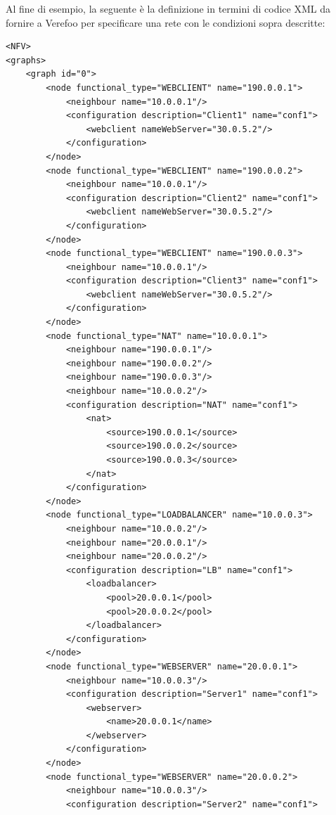 Al fine di esempio, la seguente è la definizione in termini di codice XML da fornire a Verefoo per specificare una rete con le condizioni sopra descritte: 

\begin{lstlisting}[style=mystyle,caption={Definizione nodi del ServiceGraph \ref*{fig:Service_Graph}}, label= lst:service_graphh]
<NFV>
<graphs>
    <graph id="0">
        <node functional_type="WEBCLIENT" name="190.0.0.1">
            <neighbour name="10.0.0.1"/>
            <configuration description="Client1" name="conf1">
                <webclient nameWebServer="30.0.5.2"/>
            </configuration>
        </node>
        <node functional_type="WEBCLIENT" name="190.0.0.2">
            <neighbour name="10.0.0.1"/>
            <configuration description="Client2" name="conf1">
                <webclient nameWebServer="30.0.5.2"/>
            </configuration>
        </node>
        <node functional_type="WEBCLIENT" name="190.0.0.3">
            <neighbour name="10.0.0.1"/>
            <configuration description="Client3" name="conf1">
                <webclient nameWebServer="30.0.5.2"/>
            </configuration>
        </node>
        <node functional_type="NAT" name="10.0.0.1">
            <neighbour name="190.0.0.1"/>
            <neighbour name="190.0.0.2"/>
            <neighbour name="190.0.0.3"/>
            <neighbour name="10.0.0.2"/>
            <configuration description="NAT" name="conf1">
                <nat>
                    <source>190.0.0.1</source>
                    <source>190.0.0.2</source>
                    <source>190.0.0.3</source>
                </nat>
            </configuration>
        </node>
        <node functional_type="LOADBALANCER" name="10.0.0.3">
            <neighbour name="10.0.0.2"/>
            <neighbour name="20.0.0.1"/>
            <neighbour name="20.0.0.2"/>
            <configuration description="LB" name="conf1">
                <loadbalancer>
                    <pool>20.0.0.1</pool>
                    <pool>20.0.0.2</pool>
                </loadbalancer>
            </configuration>
        </node>
        <node functional_type="WEBSERVER" name="20.0.0.1">
            <neighbour name="10.0.0.3"/>
            <configuration description="Server1" name="conf1">
                <webserver>
                    <name>20.0.0.1</name>
                </webserver>
            </configuration>
        </node>
        <node functional_type="WEBSERVER" name="20.0.0.2">
            <neighbour name="10.0.0.3"/>
            <configuration description="Server2" name="conf1">

\end{lstlisting}
